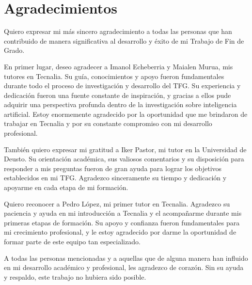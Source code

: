 \section{Agradecimientos}
Quiero expresar mi más sincero agradecimiento a todas las personas que han contribuido 
de manera significativa al desarrollo y éxito de mi Trabajo de Fin de Grado.\medskip

En primer lugar, deseo agradecer a Imanol Echeberria y Maialen Murua, mis tutores en Tecnalia. 
Su guía, conocimientos y apoyo fueron fundamentales durante todo el proceso de investigación
y desarrollo del TFG. Su experiencia y dedicación fueron una fuente constante de inspiración, 
y gracias a ellos pude adquirir una perspectiva profunda dentro de la investigación sobre
inteligencia artificial. Estoy 
enormemente agradecido por la oportunidad que me brindaron de trabajar en Tecnalia y por su 
constante compromiso con mi desarrollo profesional.\medskip

También quiero expresar mi gratitud a Iker Pastor, mi tutor en la Universidad de Deusto. Su 
orientación académica, sus valiosos comentarios y su disposición para responder a mis 
preguntas fueron de gran ayuda para lograr los objetivos establecidos en mi TFG. Agradezco 
sinceramente su tiempo y dedicación y apoyarme en cada etapa de mi formación.\medskip

Quiero reconocer a Pedro López, mi primer tutor en Tecnalia. Agradezco su 
paciencia y ayuda en mi introducción a Tecnalia y el acompañarme durante mis primeras 
etapas de formación. 
Su apoyo y confianza fueron fundamentales para mi crecimiento profesional, y le estoy agradecido 
por darme la oportunidad de formar parte de este equipo tan especializado.\medskip

A todas las personas mencionadas y a aquellas que de alguna manera han influido en mi desarrollo 
académico y profesional, les agradezco de corazón. Sin su ayuda y respaldo, este trabajo no 
hubiera sido posible.

\pagebreak
